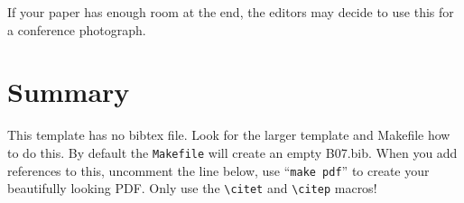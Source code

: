\documentclass[11pt,twoside]{article}
\begin{document}
If your paper has enough room at the end, the editors may decide to use this
for a conference photograph.

\section{Summary}

This template has no bibtex file.  Look for the larger template and
Makefile how to do this. By default the {\tt Makefile} will create an
empty B07.bib. When you add references to this, uncomment the
line \verb++ below, use ``{\tt make pdf}'' to create
your beautifully looking PDF. Only use the
\verb"\citet" and \verb"\citep" macros!



% 


\end{document}
